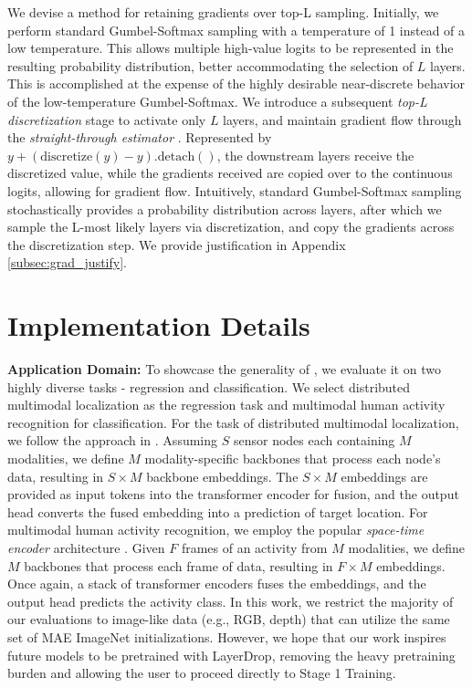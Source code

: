 We devise a method for retaining gradients over top-L sampling. Initially, we perform standard Gumbel-Softmax sampling with a temperature of 1 instead of a low temperature. This allows multiple high-value logits to be represented in the resulting probability distribution, better accommodating the selection of $L$ layers. This is accomplished at the expense of the highly desirable near-discrete behavior of the low-temperature Gumbel-Softmax. We introduce a subsequent \emph{top-L discretization} stage to activate only $L$ layers, and maintain gradient flow through the \emph{straight-through estimator} \cite{bengio2013estimating}. Represented by
$y + (\mathrm{discretize}(y) - y).\mathrm{detach}()$, the downstream layers receive the discretized value, while the gradients received are copied over to the continuous logits, allowing for gradient flow. Intuitively, standard Gumbel-Softmax sampling stochastically provides a probability distribution across layers, after which we sample the L-most likely layers via discretization, and copy the gradients across the discretization step. We provide justification in Appendix \ref{subsec:grad_justify}.


\section{Implementation Details}


\textbf{\name Application Domain:}
To showcase the generality of \name, we evaluate it on two highly diverse tasks - regression and classification. We select distributed multimodal localization as the regression task and multimodal human activity recognition for classification.  
For the task of distributed multimodal localization, we follow the approach in \cite{jeong2024gdtm}. 
Assuming $S$ sensor nodes each containing $M$ modalities, we define $M$ modality-specific backbones that process each node's data, resulting in $S \times M$ backbone embeddings. The $S \times M$ embeddings are provided as input tokens into the transformer encoder for fusion, and the output head converts the fused embedding into a prediction of target location. For multimodal human activity recognition, we employ the popular \emph{space-time encoder} architecture \cite{woo2023towards}. Given $F$ frames of an activity from $M$ modalities, we define $M$ backbones that process each frame of data, resulting in $F \times M$ embeddings. Once again, a stack of transformer encoders fuses the embeddings, and the output head predicts the activity class. %
In this work, we restrict the majority of our evaluations to image-like data (e.g., RGB, depth) that can utilize the same set of MAE ImageNet initializations. 
However, we hope that our work inspires future models to be pretrained with LayerDrop, removing the heavy pretraining burden and allowing the user to proceed directly to Stage 1 Training. 



